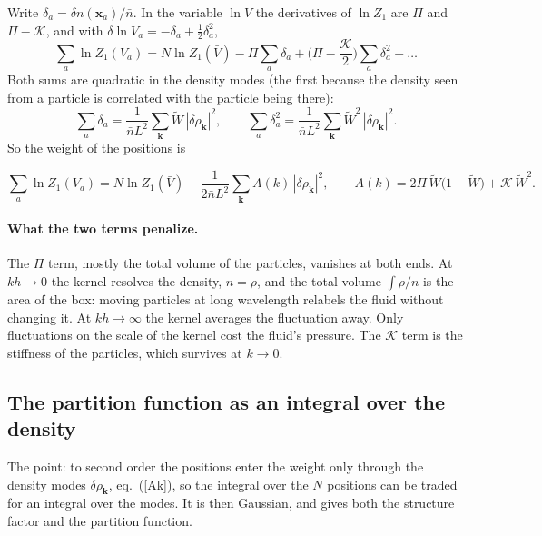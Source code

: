 \documentclass[11pt,aps,preprint,nofootinbib,superscriptaddress,tightenlines]{revtex4-2}
\def\st{\begin{equation}}
\def\stp{\end{equation}}
\def\Eq#1{eq.~(\ref{#1})}
\let\oldparagraph\paragraph
\renewcommand{\paragraph}{\par\bigskip\oldparagraph}
\begin{document}
Write $\delta_a=\delta n(\bm x_a)/\bar n$.  In the variable $\ln V$ the derivatives of $\ln Z_1$ are $\Pi$ and $\Pi-\mathcal K$, and with
$\delta\ln V_a=-\delta_a+\tfrac12\delta_a^2$,
\st
\sum_a\ln Z_1(V_a)=N\ln Z_1(\bar V)-\Pi\sum_a\delta_a+\Big(\Pi-\frac{\mathcal K}2\Big)\sum_a\delta_a^2+\dots
\stp
Both sums are quadratic in the density modes (the first because the density seen from a particle is correlated with the particle being there):
\st
\sum_a\delta_a=\frac1{\bar nL^2}\sum_{\bm k}\widetilde W\,|\delta\rho_{\bm k}|^2,\qquad
\sum_a\delta_a^2=\frac1{\bar nL^2}\sum_{\bm k}\widetilde W^2\,|\delta\rho_{\bm k}|^2 .
\stp
So the weight of the positions is
\begin{keyeq}
\st
\sum_a\ln Z_1(V_a)=N\ln Z_1(\bar V)-\frac1{2\bar nL^2}\sum_{\bm k}A(k)\,|\delta\rho_{\bm k}|^2,\qquad
A(k)=2\Pi\,\widetilde W\big(1-\widetilde W\big)+\mathcal K\,\widetilde W^2 .
\label{Ak}
\stp
\end{keyeq}

\paragraph{What the two terms penalize.}  The $\Pi$ term, mostly the total volume of the particles, vanishes at both ends.  At $kh\to0$ the kernel
resolves the density, $n=\rho$, and the total volume $\int\rho/n$ is the area of the box: moving particles at long wavelength relabels the fluid without
changing it.  At $kh\to\infty$ the kernel averages the fluctuation away.  Only fluctuations on the scale of the kernel cost the fluid's pressure.  The
$\mathcal K$ term is the stiffness of the particles, which survives at $k\to0$.

\subsection{The partition function as an integral over the density}
\label{sec:Sk}
\label{sec:posloop}

The point: to second order the positions enter the weight only through the density modes $\delta\rho_{\bm k}$, \Eq{Ak}, so the integral over the $N$ positions can
be traded for an integral over the modes.  It is then Gaussian, and gives both the structure factor and the partition function.
\end{document}
